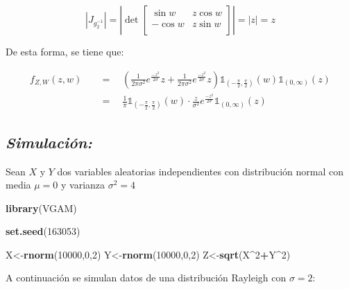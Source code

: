 \documentclass[]{article}
\newenvironment{Shaded}{\begin{snugshade}}{\end{snugshade}}
\newcommand{\KeywordTok}[1]{\textcolor[rgb]{0.13,0.29,0.53}{\textbf{#1}}}
\newcommand{\DecValTok}[1]{\textcolor[rgb]{0.00,0.00,0.81}{#1}}
\newcommand{\OperatorTok}[1]{\textcolor[rgb]{0.81,0.36,0.00}{\textbf{#1}}}
\newcommand{\NormalTok}[1]{#1}
\begin{document}
\begin{equation}
\left| J_{g_2^{-1}}  \right|
=\left| \det 
\begin{bmatrix} 
\sin w &  z\cos w \\
-\cos w &  z\sin w \\
\end{bmatrix}  \right|
=|z|=z
\end{equation}

De esta forma, se tiene que:

\begin{equation}
\begin{split}
f_{Z,W}(z,w) \quad &= \quad \left( \frac{1}{2\pi\sigma^2}e^{\frac{-z^2}{2\sigma}}z + \frac{1}{2\pi\sigma^2}e^{\frac{-z^2}{2\sigma}}z \right) \mathbb{1}_{\left(-\frac{\pi}{2},\frac{\pi}{2}\right)}(w) \mathbb{1}_{(0,\infty)}(z)\\
&=\quad \frac{1}{\pi}\mathbb{1}_{\left(-\frac{\pi}{2},\frac{\pi}{2}\right)}(w)
\cdot\frac{z}{\sigma^2}e^{\frac{-z^2}{2\sigma}} \mathbb{1}_{(0,\infty)}(z)
\end{split}
\end{equation}

\subsection{\texorpdfstring{\emph{Simulación:}}{Simulación:}}\label{simulacion-1}

Sean \(X\) y \(Y\) dos variables aleatorias independientes con
distribución normal con media \(\mu=0\) y varianza \(\sigma^2=4\)

\begin{Shaded}
\begin{Highlighting}[]
\KeywordTok{library}\NormalTok{(VGAM)}

\KeywordTok{set.seed}\NormalTok{(}\DecValTok{163053}\NormalTok{)}

\NormalTok{X<-}\KeywordTok{rnorm}\NormalTok{(}\DecValTok{10000}\NormalTok{,}\DecValTok{0}\NormalTok{,}\DecValTok{2}\NormalTok{)}
\NormalTok{Y<-}\KeywordTok{rnorm}\NormalTok{(}\DecValTok{10000}\NormalTok{,}\DecValTok{0}\NormalTok{,}\DecValTok{2}\NormalTok{)}
\NormalTok{Z<-}\KeywordTok{sqrt}\NormalTok{(X}\OperatorTok{^}\DecValTok{2}\OperatorTok{+}\NormalTok{Y}\OperatorTok{^}\DecValTok{2}\NormalTok{)}
\end{Highlighting}
\end{Shaded}

A continuación se simulan datos de una distribución Rayleigh con
\(\sigma=2\):
\end{document}
